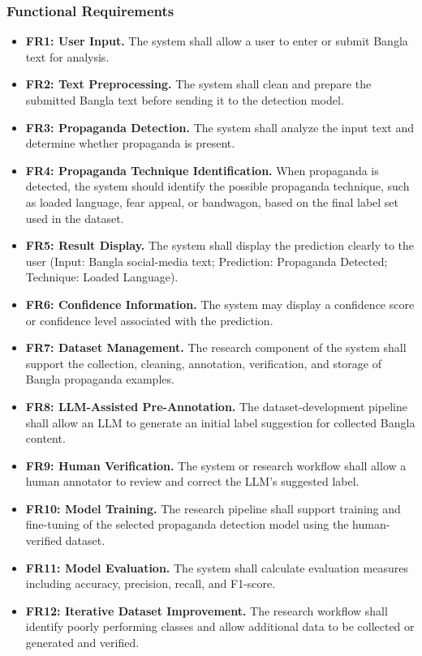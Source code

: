 \documentclass[12pt,a4paper]{report}
\begin{document}
\subsubsection*{Functional Requirements}
\begin{itemize}
  \item \textbf{FR1: User Input.} The system shall allow a user to enter or submit
        Bangla text for analysis.
  \item \textbf{FR2: Text Preprocessing.} The system shall clean and prepare the
        submitted Bangla text before sending it to the detection model.
  \item \textbf{FR3: Propaganda Detection.} The system shall analyze the input text
        and determine whether propaganda is present.
  \item \textbf{FR4: Propaganda Technique Identification.} When propaganda is
        detected, the system should identify the possible propaganda technique,
        such as loaded language, fear appeal, or bandwagon, based on the final
        label set used in the dataset.
  \item \textbf{FR5: Result Display.} The system shall display the prediction
        clearly to the user (Input: Bangla social-media text; Prediction:
        Propaganda Detected; Technique: Loaded Language).
  \item \textbf{FR6: Confidence Information.} The system may display a confidence
        score or confidence level associated with the prediction.
  \item \textbf{FR7: Dataset Management.} The research component of the system
        shall support the collection, cleaning, annotation, verification, and
        storage of Bangla propaganda examples.
  \item \textbf{FR8: LLM-Assisted Pre-Annotation.} The dataset-development
        pipeline shall allow an LLM to generate an initial label suggestion for
        collected Bangla content.
  \item \textbf{FR9: Human Verification.} The system or research workflow shall
        allow a human annotator to review and correct the LLM's suggested label.
  \item \textbf{FR10: Model Training.} The research pipeline shall support training
        and fine-tuning of the selected propaganda detection model using the
        human-verified dataset.
  \item \textbf{FR11: Model Evaluation.} The system shall calculate evaluation
        measures including accuracy, precision, recall, and F1-score.
  \item \textbf{FR12: Iterative Dataset Improvement.} The research workflow shall
        identify poorly performing classes and allow additional data to be
        collected or generated and verified.
\end{itemize}
\end{document}
